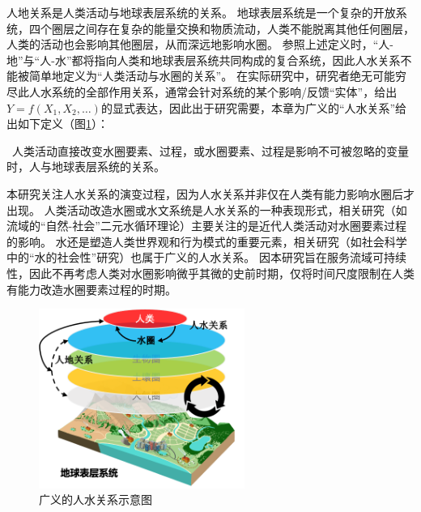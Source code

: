 人地关系是人类活动与地球表层系统的关系\cite{wu1991,li2016d}。
地球表层系统是一个复杂的开放系统，四个圈层之间存在复杂的能量交换和物质流动，人类不能脱离其他任何圈层，人类的活动也会影响其他圈层，从而深远地影响水圈。
参照上述定义时，“人-地”与“人-水”都将指向人类和地球表层系统共同构成的复合系统，因此人水关系不能被简单地定义为“人类活动与水圈的关系”。
在实际研究中，研究者绝无可能穷尽此人水系统的全部作用关系，通常会针对系统的某个影响/反馈“实体”，给出$Y = f(X_1, X_2, \dots)$的显式表达，因此出于研究需要，本章为广义的“人水关系”给出如下定义（图\ref{ch2:fig:definitions}）：

{\kai~人类活动直接改变水圈要素、过程，或水圈要素、过程是影响不可被忽略的变量时，人与地球表层系统的关系。}

本研究关注人水关系的演变过程，因为人水关系并非仅在人类有能力影响水圈后才出现。
人类活动改造水圈或水文系统是人水关系的一种表现形式，相关研究（如流域的“自然-社会”二元水循环理论）主要关注的是近代人类活动对水圈要素过程的影响\cite{wang2006, wang2016}。
水还是塑造人类世界观和行为模式的重要元素，相关研究（如社会科学中的“水的社会性”研究）也属于广义的人水关系。
因本研究旨在服务流域可持续性，因此不再考虑人类对水圈影响微乎其微的史前时期，仅将时间尺度限制在人类有能力改造水圈要素过程的时期。

\begin{figure}[!htb]
    \centering
    \includegraphics[width=0.6\textwidth]{img/ch2/ch2_scope.png}
    \caption[广义的人水关系示意图]{广义的人水关系示意图}\label{ch2:fig:definitions}
\end{figure}


